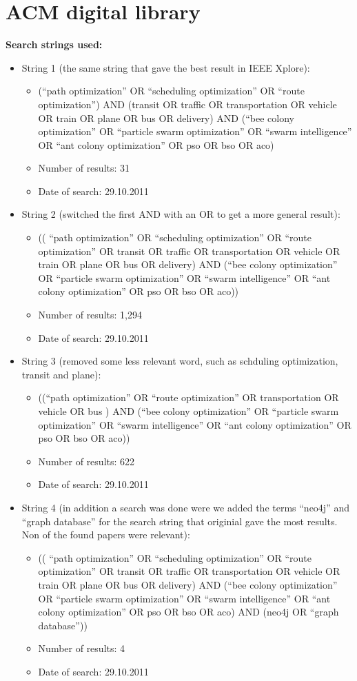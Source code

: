 \section{ACM digital library}
\textbf{Search strings used:}
\begin{itemize}
\item String 1 (the same string that gave the best result in IEEE Xplore): 
\begin{itemize}
\item (``path optimization'' OR ``scheduling optimization'' OR ``route optimization'') AND (transit OR traffic OR transportation OR vehicle OR train OR plane OR bus OR delivery) AND (``bee colony optimization'' OR ``particle swarm optimization'' OR ``swarm intelligence'' OR ``ant colony optimization'' OR pso OR bso OR aco) 
\item Number of results: 31
\item Date of search: 29.10.2011
\end{itemize}
\item String 2 (switched the first AND with an OR to get a more general result): 
\begin{itemize}
\item (( ``path optimization'' OR ``scheduling optimization'' OR ``route optimization'' OR transit OR traffic OR transportation OR vehicle OR train OR plane OR bus OR delivery) AND (``bee colony optimization'' OR ``particle swarm optimization'' OR ``swarm intelligence'' OR ``ant colony optimization'' OR pso OR bso OR aco))
\item Number of results: 1,294
\item Date of search: 29.10.2011
\end{itemize}
\item String 3 (removed some less relevant word, such as schduling optimization, transit and plane): 
\begin{itemize}
\item ((``path optimization'' OR ``route optimization'' OR transportation OR vehicle OR bus ) AND (``bee colony optimization'' OR ``particle swarm optimization'' OR ``swarm intelligence'' OR ``ant colony optimization'' OR pso OR bso OR aco))
\item Number of results: 622
\item Date of search: 29.10.2011
\end{itemize}
\item String 4 (in addition a search was done were we added the terms ``neo4j'' and ``graph database'' for the search string that originial gave the most results. Non of the found papers were relevant): 
\begin{itemize}
\item (( ``path optimization'' OR ``scheduling optimization'' OR ``route optimization'' OR transit OR traffic OR transportation OR vehicle OR train OR plane OR bus OR delivery) AND (``bee colony optimization'' OR ``particle swarm optimization'' OR ``swarm intelligence'' OR ``ant colony optimization'' OR pso OR bso OR aco) AND (neo4j OR ``graph database''))
\item Number of results: 4
\item Date of search: 29.10.2011
\end{itemize}


\end{itemize}

